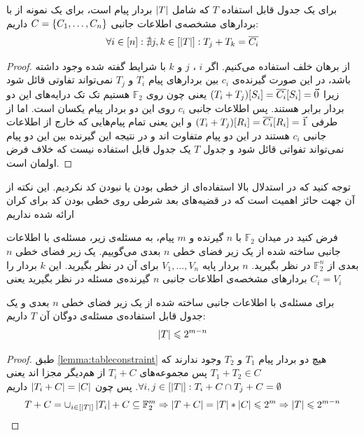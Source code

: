 \begin{lemma}
	\label{lemma:tableconstraint}
	برای یک جدول قابل استفاده
	$T$
	که شامل
	$\left|{T}\right|$
	بردار پیام است، برای یک نمونه از
	\picod
	با بردارهای مشخصه‌ی اطلاعات جانبی
	$C = \left\{ C_1, \ldots, C_n \right\}$
	داریم:
	\begin{align}
		\forall i \in [n]: \nexists j, k \in [\left|{T}\right|]: T_j + T_k = \overline{C_i}
	\end{align}
\end{lemma}
\begin{proof}
	از برهان خلف استفاده می‌کنیم. اگر
	$i$
	،
	$j$
	و
	$k$
	با شرایط گفته شده وجود داشته باشد، در این صورت گیرنده‌ی
	$c_i$
	بین بردارهای پیام
	$T_i$
	و
	$T_j$
	نمی‌تواند تفاوتی قائل شود زیرا
	$(T_i + T_j)[S_i] = \overline{C_i}[S_i] = \vec{0}$
	یعنی چون روی
	$\mathbb{F}_2$
	هستیم تک تک درایه‌های این دو بردار برابر هستند. پس اطلاعات جانبی
	$c_i$
	روی این دو بردار پیام یکسان است. اما از طرفی
	$(T_i + T_j)[R_i] = \overline{C_i}[R_i] = \vec{1}$
	و این یعنی تمام پیام‌هایی که خارج از اطلاعات جانبی
	$c_i$
	هستند در این دو پیام متفاوت اند و در نتیجه این گیرنده بین این دو پیام نمی‌تواند تفواتی قائل شود و جدول
	$T$
	یک جدول قابل استفاده نیست که خلاف فرض اولمان است.
\end{proof}
\begin{remark}
توجه کنید که در استدلال بالا استفاده‌ای از خطی بودن یا نبودن کد نکردیم. این نکته از آن جهت حائز اهمیت است که در قضیه‌های بعد شرطی روی خطی بودن کد برای کران ارائه شده نداریم
\end{remark}
\begin{definition}
	فرض کنید در میدان
	$\mathbb{F}_2$
	با 
	$n$
	گیرنده و 
	$m$
	پیام، به مسئله‌ی زیر، مسئله‌ی 
	\picod
	با اطلاعات جانبی ساخته شده از یک زیر فضای خطی
	$n$
	بعدی می‌گوییم. یک زیر فضای خطی 
	$n$
	بعدی از
	$\mathbb{F}^n_2$
	در نظر بگیرید.
	$n$
	بردار پایه
	$V_1, \ldots, V_n$
	برای آن در نظر بگیرید. این 
	$k$
	بردار را بردارهای مشخصه‌ی اطلاعات جانبی 
	$n$
	گیرنده‌ی مسئله در نظر بگیرید یعنی
	$C_i = V_i$
\end{definition}

\begin{theorem}
	برای مسئله‌ی
	\picod
	با اطلاعات جانبی ساخته شده از یک زیر فضای خطی
	$n$
	بعدی و یک جدول قابل استفاده‌ی مسئله‌ی دوگان آن
	$T$
	داریم:
	\begin{align*}
		\left|{T}\right| \leqslant 2^{m - n}
	\end{align*}
\end{theorem}
\begin{proof}
	طبق
	\autoref{lemma:tableconstraint}
	هیچ دو بردار پیام
	$T_1$
	و
	$T_2$
	وجود ندارند که
	$T_1 + T_2 \in C$
	پس مجموعه‌های
	$T_i + C$
	از هم‌دیگر مجزا اند یعنی
	$\forall i, j \in [\left|{T}\right|]: T_i + C \cap T_j + C = \emptyset$.
 پس چون
	$\left|{T_i + C}\right| = \left|{C}\right|$
	داریم
	\begin{align}
	T + C =  \cup_{i \in [\left|{T}\right|]} \left|{T_i}\right| + C \subseteq \mathbb{F}_2^m \Rightarrow \left|{T + C}\right| = \left|{T }\right| * \left|{C}\right| \leqslant 2^m \Rightarrow \left|{T}\right| \leqslant 2^{m - n}
		\end{align}
\end{proof}

